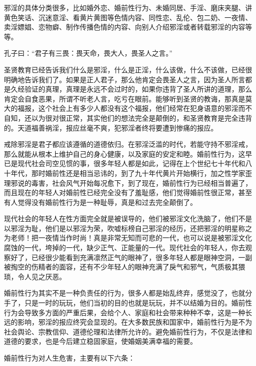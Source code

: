 \documentclass{ctexart}
\begin{document}
邪淫的具体分类很多，比如婚外恋、婚前性行为、未婚同居、手淫、磨床夹腿、讲黄色笑话、沉迷意淫、看黄片黄图等色情内容、同性恋、乱伦、包二奶、一夜情、卖淫嫖娼、恋物癖、制作传播色情的内容、向别人介绍邪淫或者转载邪淫的内容等等。

孔子曰：“君子有三畏：畏天命，畏大人，畏圣人之言。”

圣贤教育已经告诉我们什么是邪淫，什么是正淫，什么该做，什么不该做，已经很明确地告诉我们了。如果是正人君子，那么他肯定会畏圣人之言，因为圣人所言都是久经验证的真理，真理是永远不会过时的，如果你违背了圣人所讲的道理，那么肯定会自食恶果，所谓不听老人言，吃亏在眼前。能够听到圣贤的教诲，那真是莫大的福报，这个社会上有多少人都没有这个福报，他们经常在犯身语意的邪淫而不自知，还以为很对很正常，其实他们的想法完全是颠倒的，和圣贤教育是完全违背的。天道福善祸淫，报应丝毫不爽，犯邪淫者终将要遭到惨痛的报应。

戒除邪淫是君子都应该遵循的道德依归。在邪淫泛滥的时代，若能守持不邪淫戒，那么就能从根本上维护自己的身心健康，以及家庭的安定和睦。婚前性行为，这早已是现代社会司空见惯的事，很多年轻人都是如此，记得在上个世纪七十年代和八十年代，那时婚前性还是相当忌讳的，到了九十年代黄片开始横行，加之性学家歪理邪说的毒害，社会风气开始每况愈下，到了现在，婚前性行为已经相当普遍了，而且现在的年轻人对婚前性已经完全没有了羞耻感，他们觉得婚前性很正常，甚至有人觉得没有婚前性行为是一种耻辱，真是和过去完全颠倒了。

现代社会的年轻人在性方面完全就是被误导的，他们被邪淫文化洗脑了，他们不是以邪淫为耻，他们是以邪淫为荣，吹嘘标榜自己邪淫的经历，还把邪淫的明星称之为老师！把一夜情当作时尚！真是非常无知而可悲的一代，也可以说是被邪淫文化腐蚀的一代，垮掉的一代，缺少正气、正能量的一代。现代社会的年轻人，你去观察好了，已经很少能看到充满凛然正气的眼神了，很多年轻人都是眼神空洞，一副被掏空的伤精者的面容，还有不少年轻人的眼神充满了戾气和邪气，气质极其猥琐，令人见之厌恶。

婚前性行为其实不是一种负责任的行为，很多人都是始乱终弃，感觉没了，也就分手了，只是一时的玩玩，他们当初的目的也就是玩玩，并不以结婚为目的。婚前性行为会导致多方面的严重后果，会给个人、家庭和社会带来种种不幸，这是一种长远的影响，邪淫的报应终究会显现的。在大多数民族和国家中，婚前性行为是不为社会舆论、宗教信仰、道德伦理和法律所允许的。避免婚前性行为，不仅是法律和道德的要求，也是今后建立稳固家庭，使婚姻美满幸福的需要。

婚前性行为对人生危害，主要有以下六条：
\end{document}
